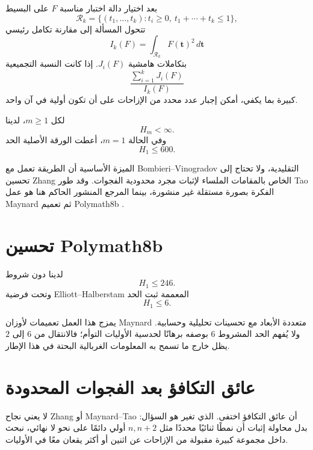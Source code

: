 بعد اختيار دالة اختبار مناسبة \(F\) على البسيط
\[
 \mathcal R_k=
 \{(t_1,\dots,t_k):t_i\ge0,\ t_1+\cdots+t_k\le1\},
\]
تتحول المسألة إلى مقارنة تكامل رئيسي
\[
 I_k(F)=\int_{\mathcal R_k}F(\mathbf t)^2\,d\mathbf t
\]
بتكاملات هامشية \(J_i(F)\). إذا كانت النسبة التجميعية
\[
 \frac{\sum_{i=1}^kJ_i(F)}{I_k(F)}
\]
كبيرة بما يكفي، أمكن إجبار عدد محدد من الإزاحات على أن تكون أولية في آن واحد.

\begin{theorem}[Maynard]
\label{thm:chapter16-maynard}
لكل \(m\ge1\)، لدينا
\[
 H_m<\infty.
\]
وفي الحالة \(m=1\)، أعطت الورقة الأصلية الحد
\[
 H_1\le600.
\]
\end{theorem}

الميزة الأساسية أن الطريقة تعمل مع Bombieri--Vinogradov التقليدية، ولا تحتاج
إلى تحسين Zhang الخاص بالمقامات الملساء لإثبات مجرد محدودية الفجوات. وقد طور
Tao الفكرة بصورة مستقلة غير منشورة، بينما المرجع المنشور الحاكم هنا هو عمل
Maynard ثم تعميم Polymath8b \cite{Polymath2014SelbergVariants}.

\section{تحسين Polymath8b}

\begin{theorem}
\label{thm:chapter16-polymath}
لدينا دون شروط
\[
 H_1\le246.
\]
وتحت فرضية Elliott--Halberstam المعممة ثبت الحد
\[
 H_1\le6.
\]
\end{theorem}

يمزج هذا العمل تعميمات لأوزان Maynard متعددة الأبعاد مع تحسينات تحليلية وحسابية.
ولا يُفهم الحد المشروط \(6\) بوصفه برهانًا لحدسية الأوليات التوأم؛ فالانتقال من
\(6\) إلى \(2\) يظل خارج ما تسمح به المعلومات الغربالية البحتة في هذا الإطار.

\section{عائق التكافؤ بعد الفجوات المحدودة}

لا يعني نجاح Zhang أو Maynard--Tao أن عائق التكافؤ اختفى. الذي تغير هو السؤال:
بدل محاولة إثبات أن نمطًا ثنائيًا محددًا مثل \(n,n+2\) أولي دائمًا على نحو لا
نهائي، نبحث داخل مجموعة كبيرة مقبولة من الإزاحات عن اثنين أو أكثر يقعان معًا في
الأوليات.

